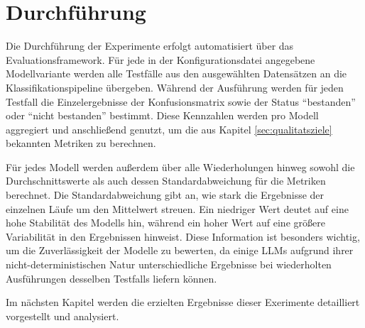 \section{Durchführung}\label{sec:durchfuhrung}

Die Durchführung der Experimente erfolgt automatisiert über das Evaluationsframework.  Für jede in der Konfigurationsdatei angegebene Modellvariante werden alle Testfälle aus den ausgewählten Datensätzen an die Klassifikationspipeline übergeben. Während der Ausführung werden für jeden Testfall die Einzelergebnisse der Konfusionsmatrix sowie der Status \enquote{bestanden} oder \enquote{nicht bestanden} bestimmt. Diese Kennzahlen werden pro Modell aggregiert und anschließend genutzt, um die aus Kapitel \ref{sec:qualitatsziele} bekannten Metriken zu berechnen.

Für jedes Modell werden außerdem über alle Wiederholungen hinweg sowohl die Durchschnittswerte als auch dessen Standardabweichung für die Metriken berechnet. Die Standardabweichung gibt an, wie stark die Ergebnisse der einzelnen Läufe um den Mittelwert streuen. Ein niedriger Wert deutet auf eine hohe Stabilität des Modells hin, während ein hoher Wert auf eine größere Variabilität in den Ergebnissen hinweist. Diese Information ist besonders wichtig, um die Zuverlässigkeit der Modelle zu bewerten, da einige \acp{LLM} aufgrund ihrer nicht-deterministischen Natur unterschiedliche Ergebnisse bei wiederholten Ausführungen desselben Testfalls liefern können.

Im nächsten Kapitel werden die erzielten Ergebnisse dieser Exerimente detailliert vorgestellt und analysiert.